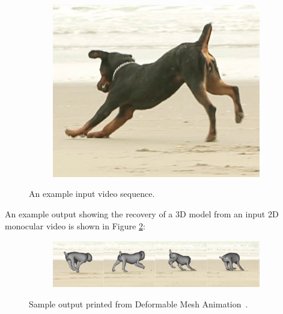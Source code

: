 \begin{figure}[H]
\begin{subfigure}{0.33\textwidth}
        \centering
            \includegraphics[width=1\linewidth]{input/208}
        \end{subfigure}%
        \caption{An example input video sequence.}
        \label{fig:arap_input}
    \end{figure}

    An example output showing the recovery of a 3D model from an input 2D monocular video is shown in Figure \ref{fig:intro_arap_output}:
    
    \begin{figure}[H]
        \centering
        \begin{subfigure}{1\textwidth}
        \centering
            \includegraphics[width=1\linewidth]{input/arapsfm_output}
        \end{subfigure}%
        \caption{Sample output printed from Deformable Mesh Animation~\cite{arap_stebbing}.}
        \label{fig:intro_arap_output}
    \end{figure}
    
